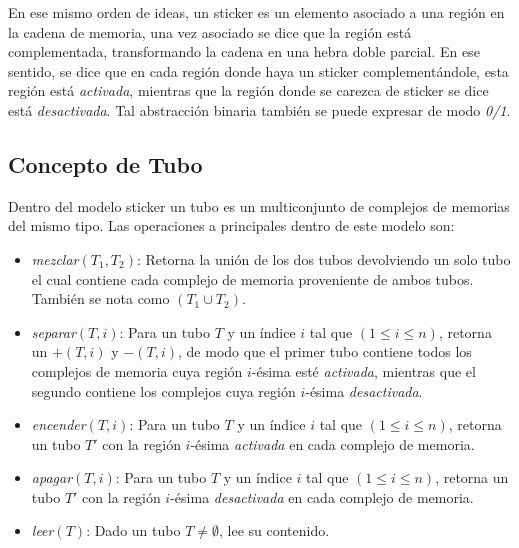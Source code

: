 \documentclass[12pt, letterpaper, twoside]{article}
\begin{document}
    En ese mismo orden de ideas, un sticker es un elemento asociado a una región en la cadena de memoria, una vez asociado se dice que la región está complementada, transformando la cadena en una hebra doble parcial. En ese sentido, se dice que en cada región donde haya un sticker complementándole, esta región está \emph{activada}, mientras que la región donde se carezca de sticker se dice está \emph{desactivada}. Tal abstracción binaria también se puede expresar de modo \emph{0/1}.

    \subsection{Concepto de Tubo}
    Dentro del modelo sticker un tubo es un multiconjunto de complejos de memorias del mismo tipo.
    Las operaciones a principales dentro de este modelo son:
    \begin{itemize}
        \item \emph{mezclar}$(T_1,T_2)$: Retorna la unión de los dos tubos devolviendo un solo tubo el cual contiene cada complejo de memoria proveniente de ambos tubos. También se nota como $(T_1\cup T_2)$.
        \item \emph{separar}$(T, i)$: Para un tubo $T$ y un índice $i$ tal que $(1 \leq i \leq n)$, retorna un $+(T, i)$ y $-(T, i)$, de modo que el primer tubo contiene todos los complejos de memoria cuya región $i$-ésima esté \emph{activada}, mientras que el segundo contiene los complejos cuya región $i$-ésima \emph{desactivada}.
        \item \emph{encender}$(T, i)$: Para un tubo $T$ y un índice $i$ tal que $(1 \leq i \leq n)$, retorna un tubo $T'$ con la región $i$-ésima \emph{activada} en cada complejo de memoria.
        \item \emph{apagar}$(T, i)$: Para un tubo $T$ y un índice $i$ tal que $(1 \leq i \leq n)$, retorna un tubo $T'$ con la región $i$-ésima \emph{desactivada} en cada complejo de memoria.
        \item \emph{leer}$(T)$: Dado un tubo $T\neq\emptyset$, lee su contenido.
    \end{itemize}
\end{document}
